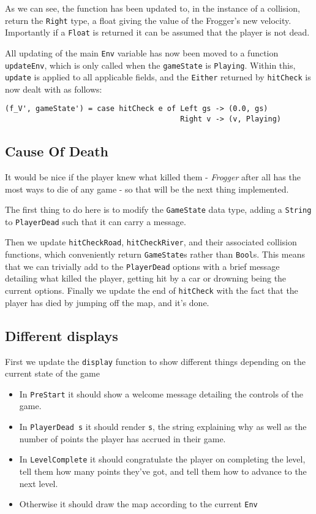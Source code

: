 \documentclass[12pt, a4paper]{report}
\begin{document}
As we can see, the function has been updated to, in the instance of a collision, return the \verb|Right| type, a float giving the value of the Frogger's new velocity.
Importantly if a \verb|Float| is returned it can be assumed that the player is not dead.

\par

All updating of the main \verb|Env| variable has now been moved to a function \verb|updateEnv|, which is only called when the \verb|gameState| is \verb|Playing|.
Within this, \verb|update| is applied to all applicable fields, and the \verb|Either| returned by \verb|hitCheck| is now dealt with as follows:

\begin{lstlisting}
(f_V', gameState') = case hitCheck e of Left gs -> (0.0, gs)
                                        Right v -> (v, Playing)
\end{lstlisting}

\subsection{Cause Of Death}

It would be nice if the player knew what killed them - \textit{Frogger} after all has the most ways to die of any game - so that will be the next thing implemented.

The first thing to do here is to modify the \verb|GameState| data type, adding a \verb|String| to \verb|PlayerDead| such that it can carry a message.

Then we update \verb|hitCheckRoad|, \verb|hitCheckRiver|, and their associated collision functions, which conveniently return \verb|GameState|s rather than \verb|Bool|s.
This means that we can trivially add to the \verb|PlayerDead| options with a brief message detailing what killed the player, getting hit by a car or drowning being the current options.
Finally we update the end of \verb|hitCheck| with the fact that the player has died by jumping off the map, and it's done.

\subsection{Different displays}

First we update the \verb|display| function to show different things depending on the current state of the game
\begin{itemize}
  \item In \verb|PreStart| it should show a welcome message detailing the controls of the game.
  \item In \verb|PlayerDead s| it should render \verb|s|, the string explaining why as well as the number of points the player has accrued in their game.
  \item In \verb|LevelComplete| it should congratulate the player on completing the level, tell them how many points they've got, and tell them how to advance to the next level.
  \item Otherwise it should draw the map according to the current \verb|Env|
\end{itemize}
\end{document}
